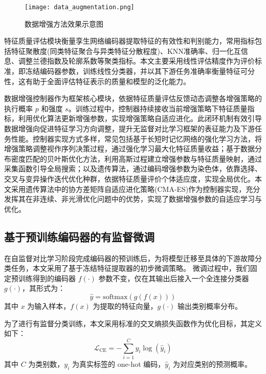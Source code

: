 \documentclass[master]{thesis-uestc}
\begin{document}
\begin{figure}[H]
    \centering
    \texttt{[image: data\_augmentation.png]}
    \caption{数据增强方法效果示意图}
    \label{data_augmentation}
\end{figure}
特征质量评估模块衡量孪生网络编码器提取特征的有效性和判别能力，常用指标包括特征聚散度(同类特征聚合与异类特征分散程度)、KNN准确率、归一化互信息、调整兰德指数及轮廓系数等聚类指标。本文主要采用线性评估精度作为评价标准，即冻结编码器参数，训练线性分类器，并以其下游任务准确率衡量特征可分性，这有助于全面评估特征表示的质量和模型的泛化能力。

数据增强控制器作为框架核心模块，依据特征质量评估反馈动态调整各增强策略的执行概率 $p$ 和强度 $s$。训练过程中，控制器持续接收当前增强策略下特征质量指标，利用优化算法更新增强参数，实现增强策略自适应进化。此闭环机制有效引导数据增强向促进特征学习方向调整，提升无监督对比学习框架的表征能力及下游任务性能。控制器实现方式多样，常见包括基于长短时记忆网络的强化学习方法，将增强策略调整视作序列决策过程，通过强化学习最大化特征质量收益；基于数据分布密度匹配的贝叶斯优化方法，利用高斯过程建立增强参数与特征质量映射，通过采集函数引导全局搜索；以及遗传算法，通过编码增强参数为染色体，依靠选择、交叉与变异操作迭代优化种群，依据特征质量评价个体适应度，实现全局优化。本文采用遗传算法中的协方差矩阵自适应进化策略(CMA-ES)作为控制器实现，充分发挥其在非连续、非光滑优化问题中的优势，实现了数据增强参数的自适应学习与优化。


\subsection{基于预训练编码器的有监督微调}

在自监督对比学习阶段完成编码器的预训练后，为将模型迁移至具体的下游故障分类任务，本文采用了基于冻结特征提取器的初步微调策略。
微调过程中，我们固定预训练得到的编码器 $f(\cdot)$ 参数不变，仅在其输出后接入一个全连接分类器 $g(\cdot)$，其形式为：
\begin{equation}
    \hat{y} = \text{softmax}(g(f(x)))
\end{equation}
其中 $x$ 为输入样本，$f(x)$ 为提取的特征向量，$g(\cdot)$ 输出类别概率分布。

为了进行有监督分类训练，本文采用标准的交叉熵损失函数作为优化目标，其定义如下：
\begin{equation}
    \mathcal{L}_{\text{CE}} = - \sum_{i=1}^{C} y_i \log(\hat{y}_i)
\end{equation}
其中 $C$ 为类别数，$y_i$ 为真实标签的 one-hot 编码，$\hat{y}_i$ 为对应类别的预测概率。
\end{document}

